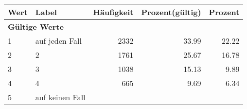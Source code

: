      \begin{longtable}{lXrrr}
     \toprule
     \textbf{Wert} & \textbf{Label} & \textbf{Häufigkeit} & \textbf{Prozent(gültig)} & \textbf{Prozent} \\
     \endhead
     \midrule
     \multicolumn{5}{l}{\textbf{Gültige Werte}}\\

     1 &
     \multicolumn{1}{X}{ auf jeden Fall   } &


       \num{2332} &
       \num[round-mode=places,round-precision=2]{33.99} &
         \num[round-mode=places,round-precision=2]{22.22} \\

     2 &
     \multicolumn{1}{X}{ 2   } &


       \num{1761} &
       \num[round-mode=places,round-precision=2]{25.67} &
         \num[round-mode=places,round-precision=2]{16.78} \\

     3 &
     \multicolumn{1}{X}{ 3   } &


       \num{1038} &
       \num[round-mode=places,round-precision=2]{15.13} &
         \num[round-mode=places,round-precision=2]{9.89} \\

     4 &
     \multicolumn{1}{X}{ 4   } &


       \num{665} &
       \num[round-mode=places,round-precision=2]{9.69} &
         \num[round-mode=places,round-precision=2]{6.34} \\

     5 &
     \multicolumn{1}{X}{ auf keinen Fall   } &



\end{longtable}
